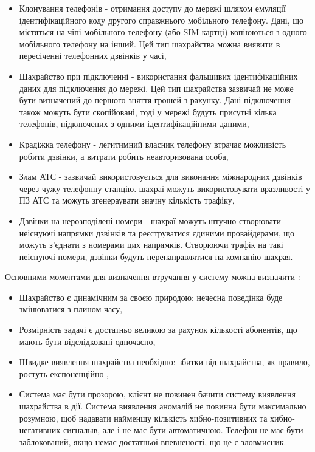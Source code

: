 \begin{itemize}
  \item Клонування телефонів - отримання доступу до мережі шляхом емуляції ідентифікаційного коду
другого справжнього мобільного телефону. Дані, що містяться на чіпі мобільного телефону (або SIM-картці) копіюються з одного мобільного телефону на інший. Цей тип шахрайства можна виявити в пересіченні телефонних дзвінків у часі,
  \item Шахрайство при підключенні - використання фальшивих ідентифікаційних даних для підключення до мережі. Цей тип шахрайства зазвичай не може бути визначений до першого зняття грошей з рахунку. Дані підключення також можуть бути скопійовані, тоді у мережі будуть присутні кілька телефонів, підключених з одними ідентифікаційними даними,
  \item Крадіжка телефону - легитимний власник телефону втрачає можливість робити дзвінки, а витрати робить неавторизована особа,
  \item Злам АТС - зазвичай використовується для виконання міжнародних дзвінків через чужу телефонну станцію. шахраї можуть використовувати вразливості у ПЗ АТС та можуть згенераувати значну кількість трафіку,
  \item Дзвінки на нерозподілені номери - шахраї можуть штучно створювати неіснуючі напрямки дзвінків та реєструватися єдиними провайдерами, що можуть з'єднати з номерами цих напрямків. Створюючи трафік на такі неіснуючі номери, дзвінки будуть перенаправлятися на компанію-шахрая.
\end{itemize}

Основними моментами для визначення втручання у систему можна визначити \cite{barson1996detection}:

\begin{itemize}
  \item Шахрайство є динамічним за своєю природою: нечесна поведінка буде змінюватися з плином часу,
  \item Розмірність задачі є достатньо великою за рахунок кількості абонентів, що мають бути відслідковані одночасно,
  \item Швидке виявлення шахрайства необхідно: збитки від шахрайства, як правило, ростуть експоненційно \cite{bliss1993fraud},
  \item Система має бути прозорою, клієнт не повинен бачити систему виявлення шахрайства в дії. Система виявлення аномалій не повинна бути максимально розумною, щоб надавати найменшу кількість хибно-позитивних та хибно-негативних сигналыв, але і не має бути автоматичною. Телефон не має бути заблокований, якщо немає достатньої впевненості, що це є зловмисник.
\end{itemize}

